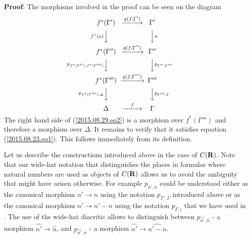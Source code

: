 \documentclass[11pt]{article}
\newenvironment{proof}{{\bf Proof}:}{\vskip 5mm }
\newcommand{\sr}{\rightarrow}
\newcommand{\rr}{{\bf R}}
\newcommand{\wh}{\widehat}
\begin{document}
\begin{proof}
The morphisms involved in the proof can be seen on the diagram
%
$$
\begin{CD}
f^*(\Gamma') @>q(f,\Gamma')>> \Gamma'\\
@Vf^*(a)VV @VVaV\\
f^*(\Gamma'') @>q(f,\Gamma'')>> \Gamma''\\
@Vp_{f^*(\Gamma''),f^*(\Gamma''')}VV @VVp_{\Gamma'',\Gamma'''}V\\
f^*(\Gamma''') @>q(f,\Gamma''')>> \Gamma'''\\
@Vp_{f^*(\Gamma'''),\Delta}VV @VVp_{\Gamma''',\Gamma}V\\
\Delta @>f>> \Gamma
\end{CD}
$$
%
The right hand side of (\ref{2015.08.29.eq2}) is a morphism over $f^*(\Gamma''')$ and therefore a morphism over $\Delta$. It remains to verify that it satisfies equation (\ref{2015.08.23.eq1}). This follows immediately from its definition. 
\end{proof}

Let us describe the constructions introduced above in the case of $C(\rr)$. Note that our wide-hat notation that distinguishes the places in formulas where natural numbers are used as objects of $C(\rr)$ allows us to avoid the ambiguity that might have arisen otherwise. For example $p_{n',n}$ could be understood either as the canonical morphism $n'\sr n$ using the notation $p_{\Gamma',\Gamma}$ introduced above or as the canonical morphism $n'\sr n'-n$ using the notation $p_{\Gamma,i}$ that we have used in \cite{Csubsystems}.  The use of the wide-hat diacritic allows to distinguish between $p_{\wh{n'},\wh{n}}$ - a morphism $\wh{n'}\sr \wh{n}$,  and $p_{\wh{n'},n}$ - a morphism $\wh{n'}\sr \wh{n'-n}$. 
\end{document}
